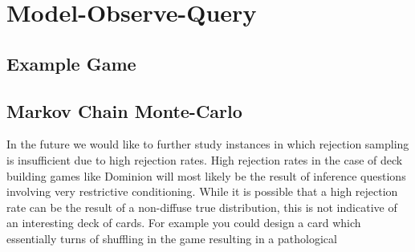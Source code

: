 
\section{Model-Observe-Query} \label{sec:moq}

\subsection{Example Game}

\subsection{Markov Chain Monte-Carlo} \label{sec:mcmc}


In the future we would like to further study instances in which rejection
sampling is insufficient due to high rejection rates. High rejection rates
in the case of deck building games like Dominion will most likely be the
result of inference questions involving very restrictive conditioning.
While it is possible that a high rejection rate can be the result of
a non-diffuse true distribution, this is not indicative of an interesting
deck of cards. For example you could design a card which essentially turns
of shuffling in the game resulting in a pathological 


